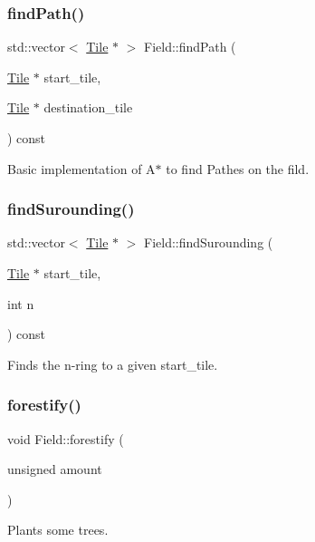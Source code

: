 \subsubsection{\texorpdfstring{find\+Path()}{findPath()}}
{\footnotesize\ttfamily std\+::vector$<$ \hyperlink{classTile}{Tile} $\ast$ $>$ Field\+::find\+Path (\begin{DoxyParamCaption}\item[{\hyperlink{classTile}{Tile} $\ast$}]{start\+\_\+tile,  }\item[{\hyperlink{classTile}{Tile} $\ast$}]{destination\+\_\+tile }\end{DoxyParamCaption}) const}

Basic implementation of A$\ast$ to find Pathes on the fild. \mbox{\label{classField_a7bc17bb858f3707e156d1fb6e32a4196}} 
\subsubsection{\texorpdfstring{find\+Surounding()}{findSurounding()}}
{\footnotesize\ttfamily std\+::vector$<$ \hyperlink{classTile}{Tile} $\ast$ $>$ Field\+::find\+Surounding (\begin{DoxyParamCaption}\item[{\hyperlink{classTile}{Tile} $\ast$}]{start\+\_\+tile,  }\item[{int}]{n }\end{DoxyParamCaption}) const}

Finds the n-\/ring to a given start\+\_\+tile. \mbox{\label{classField_aa4550e9ebc14ccaa6d1e3e110906c9b9}} 
\subsubsection{\texorpdfstring{forestify()}{forestify()}}
{\footnotesize\ttfamily void Field\+::forestify (\begin{DoxyParamCaption}\item[{unsigned}]{amount }\end{DoxyParamCaption})}

Plants some trees. \mbox{\label{classField_aab4e4dfa665fb94c158e1902f1bd46c1}} 
